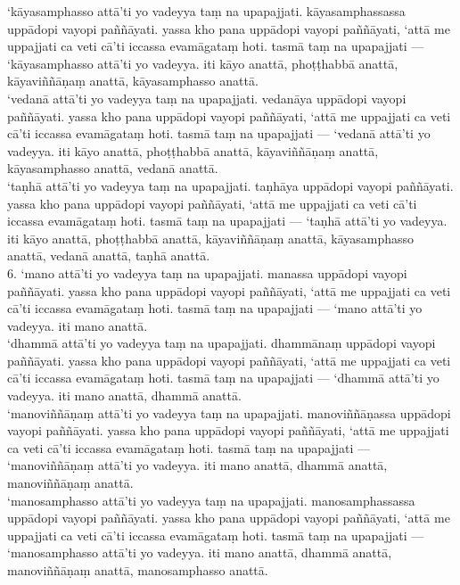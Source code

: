 \documentclass[10pt]{article}
\begin{document}
‘kāyasamphasso attā’ti yo vadeyya taṃ na upapajjati. kāyasamphassassa uppādopi vayopi paññāyati. yassa kho pana uppādopi vayopi paññāyati, ‘attā me uppajjati ca veti cā’ti iccassa evamāgataṃ hoti. tasmā taṃ na upapajjati — ‘kāyasamphasso attā’ti yo vadeyya. iti kāyo anattā, phoṭṭhabbā anattā, kāyaviññāṇaṃ anattā, kāyasamphasso anattā.\\

‘vedanā attā’ti yo vadeyya taṃ na upapajjati. vedanāya uppādopi vayopi paññāyati. yassa kho pana uppādopi vayopi paññāyati, ‘attā me uppajjati ca veti cā’ti iccassa evamāgataṃ hoti. tasmā taṃ na upapajjati — ‘vedanā attā’ti yo vadeyya. iti kāyo anattā, phoṭṭhabbā anattā, kāyaviññāṇaṃ anattā, kāyasamphasso anattā, vedanā anattā.\\

‘taṇhā attā’ti yo vadeyya taṃ na upapajjati. taṇhāya uppādopi vayopi paññāyati. yassa kho pana uppādopi vayopi paññāyati, ‘attā me uppajjati ca veti cā’ti iccassa evamāgataṃ hoti. tasmā taṃ na upapajjati — ‘taṇhā attā’ti yo vadeyya. iti kāyo anattā, phoṭṭhabbā anattā, kāyaviññāṇaṃ anattā, kāyasamphasso anattā, vedanā anattā, taṇhā anattā.\\

6. ‘mano attā’ti yo vadeyya taṃ na upapajjati. manassa uppādopi vayopi paññāyati. yassa kho pana uppādopi vayopi paññāyati, ‘attā me uppajjati ca veti cā’ti iccassa evamāgataṃ hoti. tasmā taṃ na upapajjati — ‘mano attā’ti yo vadeyya. iti mano anattā.\\

‘dhammā attā’ti yo vadeyya taṃ na upapajjati. dhammānaṃ uppādopi vayopi paññāyati. yassa kho pana uppādopi vayopi paññāyati, ‘attā me uppajjati ca veti cā’ti iccassa evamāgataṃ hoti. tasmā taṃ na upapajjati — ‘dhammā attā’ti yo vadeyya. iti mano anattā, dhammā anattā.\\

‘manoviññāṇaṃ attā’ti yo vadeyya taṃ na upapajjati. manoviññāṇassa uppādopi vayopi paññāyati. yassa kho pana uppādopi vayopi paññāyati, ‘attā me uppajjati ca veti cā’ti iccassa evamāgataṃ hoti. tasmā taṃ na upapajjati — ‘manoviññāṇaṃ attā’ti yo vadeyya. iti mano anattā, dhammā anattā, manoviññāṇaṃ anattā.\\

‘manosamphasso attā’ti yo vadeyya taṃ na upapajjati. manosamphassassa uppādopi vayopi paññāyati. yassa kho pana uppādopi vayopi paññāyati, ‘attā me uppajjati ca veti cā’ti iccassa evamāgataṃ hoti. tasmā taṃ na upapajjati — ‘manosamphasso attā’ti yo vadeyya. iti mano anattā, dhammā anattā, manoviññāṇaṃ anattā, manosamphasso anattā.\\
\end{document}
